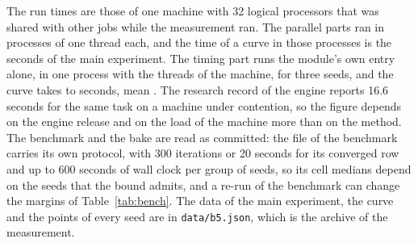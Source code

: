The run times are those of one machine with 32 logical processors that was shared with other jobs while the measurement ran. The parallel parts ran in processes of one thread each, and the time of a curve in those processes is the \timePool{} seconds of the main experiment. The timing part runs the module's own entry alone, in one process with the threads of the machine, for three seeds, and the curve takes \timeAloneMin{} to \timeAloneMax{} seconds, mean \timeAlone{}. The research record of the engine reports 16.6 seconds for the same task
on a machine under contention, so the figure depends on the engine release and on the load of the machine more than on the method. The benchmark and the bake are read as committed: the file of the benchmark carries its own protocol, with 300 iterations or 20 seconds for its converged row and up to 600 seconds of wall clock per group of seeds, so its cell medians depend on the seeds that the bound admits, and a re-run of the benchmark can change the margins of Table~\ref{tab:bench}. The data of the main experiment, the curve and the points of every seed are in \texttt{data/b5.json}, which is the archive of the measurement.
